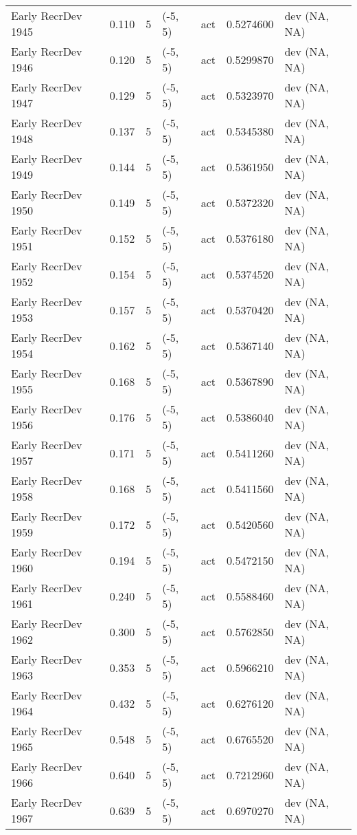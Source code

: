 \documentclass[11pt,
  english,
  letterpaper,
]{article}
\begin{document}
\begin{landscape}
\begin{longtable}[t]{>{\raggedright\arraybackslash}p{7cm}lllll>{\raggedright\arraybackslash}p{4cm}}
Early RecrDev 1945 & 0.110 & 5 & (-5, 5) & act & 0.5274600 & dev (NA, NA)\\
Early RecrDev 1946 & 0.120 & 5 & (-5, 5) & act & 0.5299870 & dev (NA, NA)\\
Early RecrDev 1947 & 0.129 & 5 & (-5, 5) & act & 0.5323970 & dev (NA, NA)\\
Early RecrDev 1948 & 0.137 & 5 & (-5, 5) & act & 0.5345380 & dev (NA, NA)\\
Early RecrDev 1949 & 0.144 & 5 & (-5, 5) & act & 0.5361950 & dev (NA, NA)\\
Early RecrDev 1950 & 0.149 & 5 & (-5, 5) & act & 0.5372320 & dev (NA, NA)\\
Early RecrDev 1951 & 0.152 & 5 & (-5, 5) & act & 0.5376180 & dev (NA, NA)\\
Early RecrDev 1952 & 0.154 & 5 & (-5, 5) & act & 0.5374520 & dev (NA, NA)\\
Early RecrDev 1953 & 0.157 & 5 & (-5, 5) & act & 0.5370420 & dev (NA, NA)\\
Early RecrDev 1954 & 0.162 & 5 & (-5, 5) & act & 0.5367140 & dev (NA, NA)\\
Early RecrDev 1955 & 0.168 & 5 & (-5, 5) & act & 0.5367890 & dev (NA, NA)\\
Early RecrDev 1956 & 0.176 & 5 & (-5, 5) & act & 0.5386040 & dev (NA, NA)\\
Early RecrDev 1957 & 0.171 & 5 & (-5, 5) & act & 0.5411260 & dev (NA, NA)\\
Early RecrDev 1958 & 0.168 & 5 & (-5, 5) & act & 0.5411560 & dev (NA, NA)\\
Early RecrDev 1959 & 0.172 & 5 & (-5, 5) & act & 0.5420560 & dev (NA, NA)\\
Early RecrDev 1960 & 0.194 & 5 & (-5, 5) & act & 0.5472150 & dev (NA, NA)\\
Early RecrDev 1961 & 0.240 & 5 & (-5, 5) & act & 0.5588460 & dev (NA, NA)\\
Early RecrDev 1962 & 0.300 & 5 & (-5, 5) & act & 0.5762850 & dev (NA, NA)\\
Early RecrDev 1963 & 0.353 & 5 & (-5, 5) & act & 0.5966210 & dev (NA, NA)\\
Early RecrDev 1964 & 0.432 & 5 & (-5, 5) & act & 0.6276120 & dev (NA, NA)\\
Early RecrDev 1965 & 0.548 & 5 & (-5, 5) & act & 0.6765520 & dev (NA, NA)\\
Early RecrDev 1966 & 0.640 & 5 & (-5, 5) & act & 0.7212960 & dev (NA, NA)\\
Early RecrDev 1967 & 0.639 & 5 & (-5, 5) & act & 0.6970270 & dev (NA, NA)\\

\end{longtable}
\end{landscape}
\end{document}
